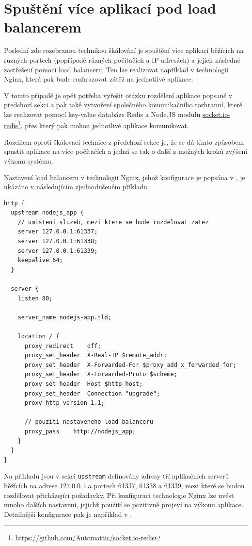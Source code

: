 \documentclass[thesis=M,czech]{FITthesis}[2012/06/26]
\newcommand\fnurl[2]{\href{#2}{#1}\footnote{\url{#2}}}
\begin{document}
\section{Spuštění více aplikací pod load balancerem}
	
	Poslední zde rozebranou technikou škálování je spuštění více aplikací běžících na různých portech (popřípadě různých počítačích a IP adresách) a jejich následné zastřešení pomocí load balanceru. Ten lze realizovat například v technologii Nginx, která pak bude rozhrazovat zátěž na jednotlivé aplikace.
	
	V tomto případě je opět potřeba vyřešit otázku rozdělení aplikace popsané v předchozí sekci a pak také vytvoření společného komunikačního rozhranní, které lze realizovat pomocí key-value databáze Redis a Node.JS modulu \fnurl{socket.io-redis}{https://github.com/Automattic/socket.io-redis}, přes který pak mohou jednotlivé aplikace komunikovat.
	
	Rozdílem oproti škálovací technice z předchozí sekce je, že se dá tímto způsobem spustit aplikace na více počítačích a jedná se tak o další z možných kroků zvýšení výkonu systému.
	
	Nastavení load balanceru v technologii Nginx, jehož konfigurace je popsána v \cite{NginXLoadbalancer}, je ukázáno v následujícím zjednodušeném příkladu:
	
\begin{lstlisting}[basicstyle={\tiny\ttfamily}, frame=single]
http {
  upstream nodejs_app {
    // umisteni sluzeb, mezi ktere se bude rozdelovat zatez
    server 127.0.0.1:61337;
    server 127.0.0.1:61338;
    server 127.0.0.1:61339;
    keepalive 64;
  }

  server {
    listen 80;

    server_name nodejs-app.tld;

    location / {
      proxy_redirect	off;
      proxy_set_header	X-Real-IP $remote_addr;
      proxy_set_header	X-Forwarded-For $proxy_add_x_forwarded_for;
      proxy_set_header	X-Forwarded-Proto $scheme;
      proxy_set_header	Host $http_host;
      proxy_set_header	Connection "upgrade";
      proxy_http_version 1.1;

      // pouziti nastaveneho load balanceru
      proxy_pass	http://nodejs_app;
    }
  }
}
\end{lstlisting}

Na příkladu jsou v sekci \texttt{upstream} definovány adresy tří aplikačních serverů běžících na adrese 127.0.0.1 a portech 61337, 61338 a 61339, mezi které se budou rozdělovat přicházející požadavky. Při konfiguraci technologie Nginx lze uvést mnoho dalších nastavení, jejichž použití se pozitivně projeví na výkonu aplikace. Detailnější konfigurace pak je například v \cite{NginXConfigExample}.
\end{document}
